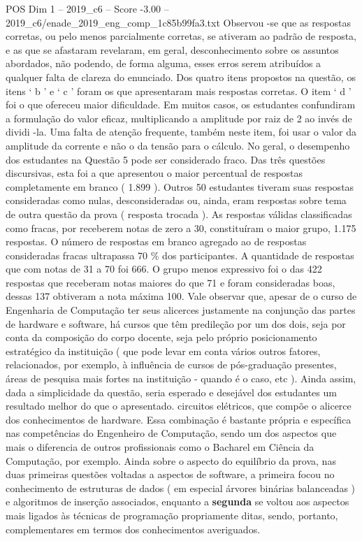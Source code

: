 \begin{textsample}{POS Dim 1 – 2019\_c6 – Score -3.00 – 2019\_c6/enade\_2019\_eng\_comp\_1c85b99fa3.txt}
Observou -se que as respostas corretas, ou pelo menos parcialmente corretas, se ativeram ao padrão de resposta, e as que se afastaram revelaram, em geral, desconhecimento sobre os assuntos abordados, não podendo, de forma alguma, esses erros serem atribuídos a qualquer falta de clareza do enunciado.
Dos quatro itens propostos na questão, os itens ‘ b ’ e ‘ c ’ foram os que apresentaram mais respostas corretas.
O item ‘ d ’ foi o que ofereceu maior dificuldade.
Em muitos casos, os estudantes confundiram a formulação do valor eficaz, multiplicando a amplitude por raiz de 2 ao invés de dividi -la.
Uma falta de atenção frequente, também neste item, foi usar o valor da amplitude da corrente e não o da tensão para o cálculo.
No geral, o desempenho dos estudantes na Questão 5 pode ser considerado fraco.
Das três questões discursivas, esta foi a que apresentou o maior percentual de respostas completamente em branco ( 1.899 ).
Outros 50 estudantes tiveram suas respostas consideradas como nulas, desconsideradas ou, ainda, eram respostas sobre tema de outra questão da prova ( resposta trocada ).
As respostas válidas classificadas como fracas, por receberem notas de zero a 30, constituíram o maior grupo, 1.175 respostas.
O número de respostas em branco agregado ao de respostas consideradas fracas ultrapassa 70 \% dos participantes.
A quantidade de respostas que com notas de 31 a 70 foi 666.
O grupo menos expressivo foi o das 422 respostas que receberam notas maiores do que 71 e foram consideradas boas, dessas 137 obtiveram a nota máxima 100.
Vale observar que, apesar de o curso de Engenharia de Computação ter seus alicerces justamente na conjunção das partes de hardware e software, há cursos que têm predileção por um dos dois, seja por conta da composição do corpo docente, seja pelo próprio posicionamento estratégico da instituição ( que pode levar em conta vários outros fatores, relacionados, por exemplo, à influência de cursos de pós-graduação presentes, áreas de pesquisa mais fortes na instituição - quando é o caso, etc ).
Ainda assim, dada a simplicidade da questão, seria esperado e desejável dos estudantes um resultado melhor do que o apresentado. circuitos elétricos, que compõe o alicerce dos conhecimentos de hardware.
Essa combinação é bastante própria e específica nas competências do Engenheiro de Computação, sendo um dos aspectos que mais o diferencia de outros profissionais como o Bacharel em Ciência da Computação, por exemplo.
Ainda sobre o aspecto do equilíbrio da prova, nas duas primeiras questões voltadas a aspectos de software, a primeira focou no conhecimento de estruturas de dados ( em especial árvores binárias balanceadas ) e algoritmos de inserção associados, enquanto a \textbf{segunda} se voltou aos aspectos mais ligados às técnicas de programação propriamente ditas, sendo, portanto, complementares em termos dos conhecimentos averiguados.

\end{textsample}

